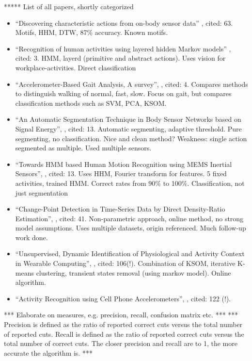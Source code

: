 *****
List of all papers, shortly categorized
\begin{itemize}
  \item ``Discovering characteristic actions from on-body sensor data'' \cite{minnen2006discovering}, cited: 63. Motifs, HHM, DTW, 87\% accuracy. Known motifs.
  \item ``Recognition of human activities using layered hidden Markov models'' \cite{perdikis2008recognition}, cited: 3. HMM, layerd (primitive and abstract actions). Uses vision for workplace-activities. Direct classification
  \item ``Accelerometer-Based Gait Analysis, A survey'', \cite{derawi2010accelerometer}, cited: 4. Compares methods to distinguish walking of normal, fast, slow. Focus on gait, but compares classification methods such as SVM, PCA, KSOM.
  \item ``An Automatic Segmentation Technique in Body Sensor Networks based on Signal Energy'', \cite{guenterberg2009automatic}, cited: 13. Automatic segmenting, adaptive threshold. Pure segmenting, no classification. Nice and clean method? Weakness: single action segmented as multiple. Used multiple sensors.
  \item ``Towards HMM based Human Motion Recognition using MEMS Inertial Sensors'', \cite{shi2009towards}, cited: 13. Uses HHM, Fourier transform for features. 5 fixed activities, trained HMM. Correct rates from 90\% to 100\%. Classification, not just segmentation
  \item ``Change-Point Detection in Time-Series Data by Direct Density-Ratio Estimation'', \cite{kawahara2009change}, cited: 41. Non-parametric approach, online method, no strong model assumptions. Uses multiple datasets, origin referenced. Much follow-up work done.
  \item ``Unsupervised, Dynamic Identification of Physiological and Activity Context in Wearable Computing'', \cite{krause2003unsupervised}, cited: 106(!). Combination of KSOM, iterative K-means clustering, transient states removal (using markov model). Online algorithm.
  \item ``Activity Recognition using Cell Phone Accelerometers'', \cite{kwapisz2011activity}, cited: 122 (!).
\end{itemize}





*** Elaborate on measures, e.g. precision, recall, confusion matrix etc.  ***
*** Precision is defined as the ratio of reported correct cuts versus the total number of reported cuts. Recall is defined as the ratio of reported correct cuts versus the total number of correct cuts. The closer precision and recall are to 1, the more accurate the algorithm is. ***
